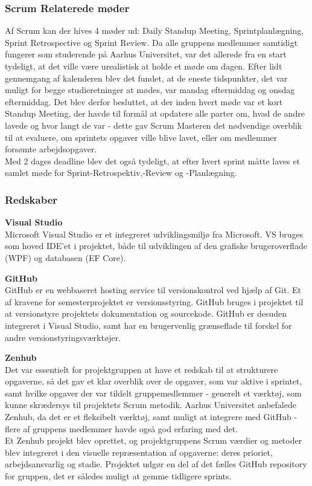 \documentclass[a4paper,12pt,fleqn,oneside]{article}
\begin{document}
\subsubsection{Scrum Relaterede møder} 
Af Scrum kan der hives 4 møder ud: Daily Standup Meeting, Sprintplanlægning, Sprint Retrospective og Sprint Review. Da alle gruppens medlemmer samtidigt fungerer som studerende på Aarhus Universitet, var det allerede fra en start tydeligt, at det ville være urealistisk at holde et møde om dagen. Efter lidt gennemgang af kalenderen blev det fundet, at de eneste tidspunkter, det var muligt for begge studieretninger at mødes, var mandag eftermiddag og onsdag eftermiddag. Det blev derfor besluttet, at der inden hvert møde var et kort Standup Meeting, der havde til formål at opdatere alle parter om, hvad de andre lavede og hvor langt de var - dette gav Scrum Masteren det nødvendige overblik til at evaluere, om sprintets opgaver ville blive lavet, eller om medlemmer forsømte arbejdsopgaver. \\
Med 2 dages deadline blev det også tydeligt, at efter hvert sprint måtte laves et samlet møde for Sprint-Retrospektiv,-Review og -Planlægning. 

\subsubsection{Redskaber} 
\textbf{Visual Studio}\\
Microsoft Visual Studio er et integreret udviklingsmiljø fra Microsoft. VS bruges som hoved IDE'et i projektet, både til udviklingen af den grafiske brugeroverflade (WPF) og databasen (EF Core). 

\textbf{GitHub}\\
GitHub er en webbaseret hosting service til versionskontrol ved hjælp af Git. Et af kravene for semesterprojektet er versionsstyring. GitHub bruges i projektet til at versionstyre projektets dokumentation og sourcekode. GitHub er desuden integreret i Visual Studio, samt har en brugervenlig grænseflade til forskel for andre versionstyringsværktøjer. 

\textbf{Zenhub}\\
Det var essentielt for projektgruppen at have et redskab til at strukturere opgaverne, så det gav et klar overblik over de opgaver, som var aktive i sprintet, samt hvilke opgaver der var tildelt gruppemedlemmer - generelt et værktøj, som kunne skrædersys til projektets Scrum metodik. Aarhus Universitet anbefalede Zenhub, da det er et fleksibelt værktøj, samt muligt at integrere med GitHub - flere af gruppens medlemmer havde også god erfaring med det. \\
Et Zenhub projekt blev oprettet, og projektgruppens Scrum værdier og metoder blev integreret i den visuelle repræsentation af opgaverne: deres prioriet, arbejdsansvarlig og stadie. Projektet udgør en del af det fælles GitHub repository for gruppen, det er således muligt at gemme tidligere sprints. 
\end{document}
